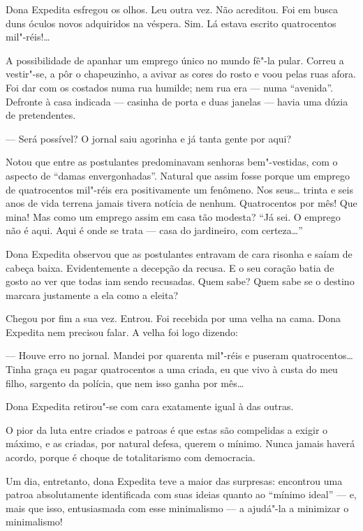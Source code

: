 Dona Expedita esfregou os olhos. Leu outra vez. Não acreditou. Foi em
busca duns óculos novos adquiridos na véspera. Sim. Lá estava escrito
quatrocentos mil"-réis!\ldots{}

A possibilidade de apanhar um emprego único no mundo fê"-la pular. Correu
a vestir"-se, a pôr o chapeuzinho, a avivar as cores do rosto e voou
pelas ruas afora. Foi dar com os costados numa rua humilde; nem rua era
--- numa ``avenida''. Defronte à casa indicada --- casinha de porta e
duas janelas --- havia uma dúzia de pretendentes.

--- Será possível? O jornal saiu agorinha e já tanta gente por aqui?

Notou que entre as postulantes predominavam senhoras bem"-vestidas, com o
aspecto de ``damas envergonhadas''. Natural que assim fosse porque um
emprego de quatrocentos mil"-réis era positivamente um fenômeno. Nos
seus\ldots{} trinta e seis anos de vida terrena jamais tivera notícia de
nenhum. Quatrocentos por mês! Que mina! Mas como um emprego assim em
casa tão modesta? ``Já sei. O emprego não é aqui. Aqui é onde se trata
--- casa do jardineiro, com certeza\ldots{}''

Dona Expedita observou que as postulantes entravam de cara risonha e
saíam de cabeça baixa. Evidentemente a decepção da recusa. E o seu
coração batia de gosto ao ver que todas iam sendo recusadas. Quem sabe?
Quem sabe se o destino marcara justamente a ela como a eleita?

Chegou por fim a sua vez. Entrou. Foi recebida por uma velha na cama.
Dona Expedita nem precisou falar. A velha foi logo dizendo:

--- Houve erro no jornal. Mandei por quarenta mil"-réis e puseram
quatrocentos\ldots{} Tinha graça eu pagar quatrocentos a uma criada, eu que
vivo à custa do meu filho, sargento da polícia, que nem isso ganha por
mês\ldots{}

Dona Expedita retirou"-se com cara exatamente igual à das outras.

O pior da luta entre criados e patroas é que estas são compelidas a
exigir o máximo, e as criadas, por natural defesa, querem o mínimo.
Nunca jamais haverá acordo, porque é choque de totalitarismo com
democracia.

Um dia, entretanto, dona Expedita teve a maior das surpresas: encontrou
uma patroa absolutamente identificada com suas ideias quanto ao ``mínimo
ideal'' --- e, mais que isso, entusiasmada com esse minimalismo --- a
ajudá"-la a minimizar o minimalismo!

